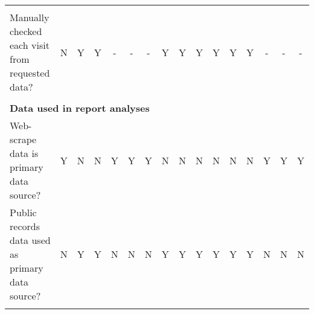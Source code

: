 \begin{tabular*}{\linewidth}{@{\extracolsep{\fill} } lccccccccccccccc}
&&&&&&&&&&&&&&&\\%
\hspace{0.2cm} Manually checked each visit from requested data?&N&Y&Y&{-}&{-}&{-}&Y&Y&Y&Y&Y&Y&{-}&{-}&{-}\\%
&&&&&&&&&&&&&&&\\%
\multicolumn{16}{l}{\bfseries Data used in report analyses}\\%
\hspace{0.2cm} Web-scrape data is primary data source?&Y&N&N&Y&Y&Y&N&N&N&N&N&N&Y&Y&Y\\%
\hspace{0.2cm} Public records data used as primary data source?&N&Y&Y&N&N&N&Y&Y&Y&Y&Y&Y&N&N&N\\%
&&&&&&&&&&&&&&&\\%
\hline%
\end{tabular*}